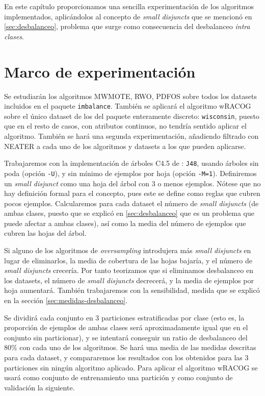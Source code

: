 \label{ch:sdisjuncts}
En este capítulo proporcionamos una sencilla experimentación de los algoritmos implementados, aplicándolos al concepto de 
\textit{small disjuncts} que se mencionó en \ref{sec:desbalanceo}, problema que surge como consecuencia del desbalanceo
\textit{intra clases}.

\section{Marco de experimentación}
Se estudiarán los algoritmos MWMOTE, RWO, PDFOS sobre todos los datasets incluidos en el paquete \texttt{imbalance}. 
También se aplicará el algoritmo wRACOG sobre el único dataset de los del paquete enteramente discreto: \texttt{wisconsin},
puesto que en el resto de casos, con atributos continuos, no tendría sentido aplicar el algoritmo. También se hará una 
segunda experimentación, añadiendo filtrado con NEATER a cada uno de los algoritmos y datasets a los que pueden aplicarse.

Trabajaremos con la implementación de árboles C4.5 de : \texttt{J48}, usando árboles sin poda 
(opción \texttt{-U}), y sin mínimo de ejemplos por hoja (opción \texttt{-M=1}). 
Definiremos un \textit{small disjunct} como una hoja del árbol con 3 o menos ejemplos. Nótese 
que no hay definición formal para el concepto, pues este se define como reglas que cubren pocos ejemplos. Calcularemos para 
cada dataset el número de \textit{small disjuncts} (de ambas clases, puesto que se explicó en \ref{sec:desbalanceo} que 
es un problema que puede afectar a ambas clases), así como la media del número de ejemplos que cubren las hojas del árbol.

Si alguno de los algoritmos de \textit{oversampling} introdujera más \textit{small disjuncts} en lugar de eliminarlos, 
la media de cobertura de las hojas bajaría, y el número de \textit{small disjuncts} crecería. Por tanto teorizamos que si eliminamos 
desbalanceo en los datasets, el número de \textit{small disjuncts} decrecerá, y la media de ejemplos por hoja aumentará. 
También trabajaremos con la sensibilidad, medida que se explicó en la sección \ref{sec:medidas-desbalanceo}.

Se dividirá cada conjunto en 3 particiones estratificadas por clase (esto es, la proporción de ejemplos de ambas
clases será aproximadamente igual que en el conjunto sin particionar), y se intentará conseguir un ratio de desbalanceo del
80\% con cada uno de los algoritmos. Se hará una media de las medidas descritas para cada dataset, y compararemos los 
resultados con los obtenidos para las 3 particiones sin ningún algoritmo aplicado. Para aplicar el algoritmo wRACOG se usará
como conjunto de entrenamiento una partición y como conjunto de validación la siguiente.

